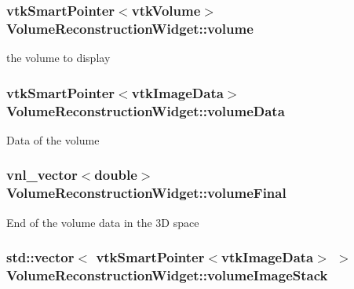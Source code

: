 \hypertarget{class_volume_reconstruction_widget_a40d53f5d382c03ff1ea33531f0c90394}{
\subsubsection[{volume}]{\setlength{\rightskip}{0pt plus 5cm}vtk\-Smart\-Pointer$<$vtk\-Volume$>$ {\bf Volume\-Reconstruction\-Widget\-::volume}}}\label{d5/d55/class_volume_reconstruction_widget_a40d53f5d382c03ff1ea33531f0c90394}
the volume to display \hypertarget{class_volume_reconstruction_widget_a88b81c92ab3f640a7e1e9f8bbf40a2ba}{
\subsubsection[{volume\-Data}]{\setlength{\rightskip}{0pt plus 5cm}vtk\-Smart\-Pointer$<$vtk\-Image\-Data$>$ {\bf Volume\-Reconstruction\-Widget\-::volume\-Data}}}\label{d5/d55/class_volume_reconstruction_widget_a88b81c92ab3f640a7e1e9f8bbf40a2ba}
Data of the volume \hypertarget{class_volume_reconstruction_widget_abb6e7b4895b0a9e6b60419b432b9afcb}{
\subsubsection[{volume\-Final}]{\setlength{\rightskip}{0pt plus 5cm}vnl\-\_\-vector$<$double$>$ {\bf Volume\-Reconstruction\-Widget\-::volume\-Final}}}\label{d5/d55/class_volume_reconstruction_widget_abb6e7b4895b0a9e6b60419b432b9afcb}
End of the volume data in the 3\-D space \hypertarget{class_volume_reconstruction_widget_a521dcefa95fe4f079622c83e162349b5}{
\subsubsection[{volume\-Image\-Stack}]{\setlength{\rightskip}{0pt plus 5cm}std\-::vector$<$ vtk\-Smart\-Pointer$<$vtk\-Image\-Data$>$ $>$ {\bf Volume\-Reconstruction\-Widget\-::volume\-Image\-Stack}}}\label{d5/d55/class_volume_reconstruction_widget_a521dcefa95fe4f079622c83e162349b5}
